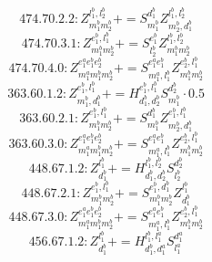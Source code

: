 \documentclass[letterpaper,10pt,fleqn,leqno,onecolumn]{article}
\begin{document}
\begin{equation} \;\;\;\;\;\;  474.70.2.2: Z^{l_{1}^{b},l_{2}^{b}}_{m_{1}^{b}m_{2}^{b}}+=S^{d_{1}^{b}}_{m_{1}^{b}}Z^{l_{1}^{b},l_{2}^{b}}_{m_{2}^{b},d_{1}^{b}} \end{equation}
\begin{equation} \;\;\;\;\;\;  474.70.3.1: Z^{e_{1}^{b},l_{1}^{b}}_{m_{1}^{b}m_{2}^{b}}+=S^{e_{1}^{b}}_{l_{2}^{b}}Z^{l_{1}^{b},l_{2}^{b}}_{m_{1}^{b}m_{2}^{b}} \end{equation}
\begin{equation} \;\;\;\;\;\;  474.70.4.0: Z^{e_{1}^{a}e_{1}^{b}e_{2}^{b}}_{m_{1}^{a}m_{1}^{b}m_{2}^{b}}+=S^{e_{1}^{a}e_{1}^{b}}_{m_{1}^{a},l_{1}^{b}}Z^{e_{2}^{b},l_{1}^{b}}_{m_{1}^{b}m_{2}^{b}} \end{equation}
\begin{equation} \;\;\;\;\;\;  363.60.1.2: Z^{e_{1}^{b},l_{1}^{b}}_{m_{1}^{b},d_{1}^{b}}+=H^{e_{1}^{b},l_{1}^{b}}_{d_{1}^{b},d_{2}^{b}}S^{d_{2}^{b}}_{m_{1}^{b}}\cdot 0.5 \end{equation}
\begin{equation} \;\;\;\;\;\;  363.60.2.1: Z^{e_{1}^{b},l_{1}^{b}}_{m_{1}^{b}m_{2}^{b}}+=S^{d_{1}^{b}}_{m_{1}^{b}}Z^{e_{1}^{b},l_{1}^{b}}_{m_{2}^{b},d_{1}^{b}} \end{equation}
\begin{equation} \;\;\;\;\;\;  363.60.3.0: Z^{e_{1}^{a}e_{1}^{b}e_{2}^{b}}_{m_{1}^{a}m_{1}^{b}m_{2}^{b}}+=S^{e_{1}^{a}e_{1}^{b}}_{m_{1}^{a},l_{1}^{b}}Z^{e_{2}^{b},l_{1}^{b}}_{m_{1}^{b}m_{2}^{b}} \end{equation}
\begin{equation} \;\;\;\;\;\;  448.67.1.2: Z^{l_{1}^{b}}_{d_{1}^{b}}+=H^{l_{1}^{b},l_{2}^{b}}_{d_{1}^{b},d_{2}^{b}}S^{d_{2}^{b}}_{l_{2}^{b}} \end{equation}
\begin{equation} \;\;\;\;\;\;  448.67.2.1: Z^{e_{1}^{b},l_{1}^{b}}_{m_{1}^{b}m_{2}^{b}}+=S^{e_{1}^{b},d_{1}^{b}}_{m_{1}^{b}m_{2}^{b}}Z^{l_{1}^{b}}_{d_{1}^{b}} \end{equation}
\begin{equation} \;\;\;\;\;\;  448.67.3.0: Z^{e_{1}^{a}e_{1}^{b}e_{2}^{b}}_{m_{1}^{a}m_{1}^{b}m_{2}^{b}}+=S^{e_{1}^{a}e_{1}^{b}}_{m_{1}^{a},l_{1}^{b}}Z^{e_{2}^{b},l_{1}^{b}}_{m_{1}^{b}m_{2}^{b}} \end{equation}
\begin{equation} \;\;\;\;\;\;  456.67.1.2: Z^{l_{1}^{b}}_{d_{1}^{b}}+=H^{l_{1}^{b},l_{1}^{a}}_{d_{1}^{b},d_{1}^{a}}S^{d_{1}^{a}}_{l_{1}^{a}} \end{equation}
\end{document}
